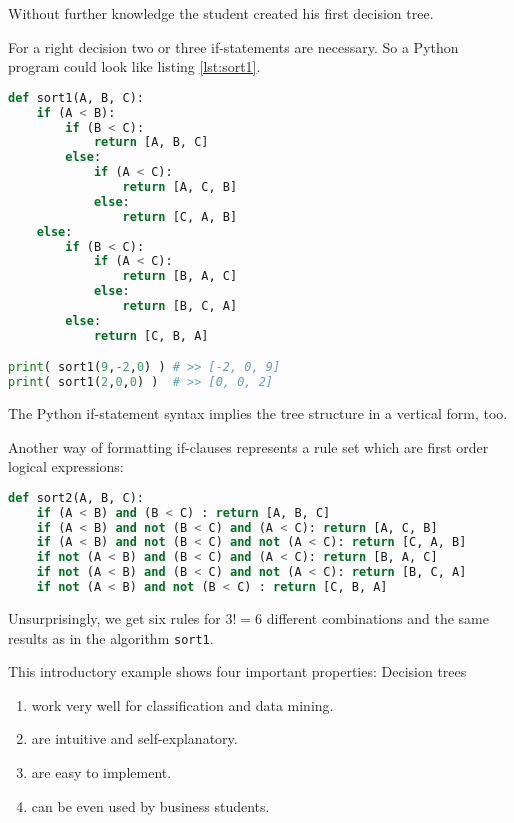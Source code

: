Without further knowledge the student created his first decision tree.

For a right decision two or three if-statements are necessary. So a Python program could look like listing \ref{lst:sort1}.

\newpage

\begin{lstlisting}[style = fau, language = Python, caption={[A Python implementation of a decision tree for sorting three elements]A Python implementation of a decision tree for sorting three elements $A, B, C$},label=lst:sort1]
def sort1(A, B, C):
	if (A < B):
		if (B < C):
			return [A, B, C]
		else:
			if (A < C):
				return [A, C, B]
			else:
				return [C, A, B]
	else:
		if (B < C):
			if (A < C):
				return [B, A, C]
			else:
				return [B, C, A]
		else:
			return [C, B, A]

print( sort1(9,-2,0) ) # >> [-2, 0, 9]
print( sort1(2,0,0) )  # >> [0, 0, 2]
\end{lstlisting}

\begin{remark}
    The Python if-statement syntax implies the tree structure in a vertical form, too.      
\end{remark}

Another way of formatting if-clauses represents a rule set which are first order logical expressions:  
    \begin{lstlisting}[style = fau, language = Python, caption={A Python reimplementation of the decision tree given in listing \ref{lst:sort1} as a set of first order logical rules},label=lst:sort2]
def sort2(A, B, C):
	if (A < B) and (B < C) : return [A, B, C]
	if (A < B) and not (B < C) and (A < C): return [A, C, B]
	if (A < B) and not (B < C) and not (A < C): return [C, A, B]
	if not (A < B) and (B < C) and (A < C): return [B, A, C]
	if not (A < B) and (B < C) and not (A < C): return [B, C, A]
	if not (A < B) and not (B < C) : return [C, B, A]
\end{lstlisting}

Unsurprisingly, we get six rules for $3! = 6$ different combinations and the same results as in the algorithm \texttt{sort1}. 


This introductory example shows four important properties: Decision trees
\begin{enumerate}
    \item work very well for classification and data mining.
    \item are intuitive and self-explanatory.
    \item are easy to implement.
    \item can be even used by business students.
\end{enumerate}

